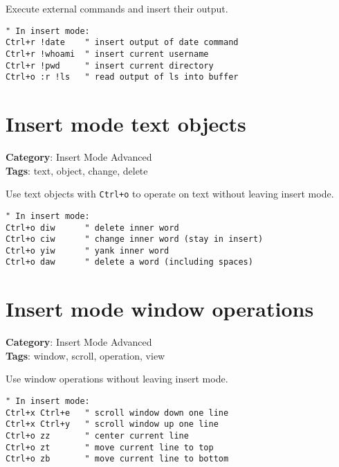 {{{{{{Execute external commands and insert their output.

\begin{Exa*}{}
\begin{Verbatim}[fontsize=\footnotesize, breaklines, breakanywhere]
" In insert mode:
Ctrl+r !date    " insert output of date command
Ctrl+r !whoami  " insert current username
Ctrl+r !pwd     " insert current directory
Ctrl+o :r !ls   " read output of ls into buffer
\end{Verbatim}
\end{Exa*}

\section{Insert mode text objects}

\textbf{Category}: Insert Mode Advanced\\ \textbf{Tags}: text, object, change, delete
\vspace{0.5cm}

Use text objects with {\footnotesize \Verb§Ctrl+o§} to operate on text without leaving insert mode.

\begin{Exa*}{}
\begin{Verbatim}[fontsize=\footnotesize, breaklines, breakanywhere]
" In insert mode:
Ctrl+o diw      " delete inner word
Ctrl+o ciw      " change inner word (stay in insert)
Ctrl+o yiw      " yank inner word
Ctrl+o daw      " delete a word (including spaces)
\end{Verbatim}
\end{Exa*}

\section{Insert mode window operations}

\textbf{Category}: Insert Mode Advanced\\ \textbf{Tags}: window, scroll, operation, view
\vspace{0.5cm}

Use window operations without leaving insert mode.

\begin{Exa*}{}
\begin{Verbatim}[fontsize=\footnotesize, breaklines, breakanywhere]
" In insert mode:
Ctrl+x Ctrl+e   " scroll window down one line
Ctrl+x Ctrl+y   " scroll window up one line  
Ctrl+o zz       " center current line
Ctrl+o zt       " move current line to top
Ctrl+o zb       " move current line to bottom
\end{Verbatim}
\end{Exa*}

}}}}}}

